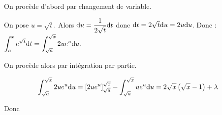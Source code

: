 \documentclass[a4paper,french,bookmarks]{article}
\begin{document}
\begin{enumerate}
{    On procède d'abord par changement de variable.
    
    On pose $u = \sqrt t$. Alors $\text du = \dfrac{1}{2\sqrt{t}}\text dt$ donc $\text dt = 2\sqrt{t}\text du = 2u\text du$. Donc :
    $\displaystyle \int_a^x e^{\sqrt t} \text dt = \int_{\sqrt a}^{\sqrt x} 2ue^u \text du$.
    
    On procède alors par intégration par partie.
    
    \[\int_{\sqrt a}^{\sqrt x} 2ue^u \text du = \left[2ue^u\right]_{\sqrt a}^{\sqrt x} - \int_{\sqrt a}^{\sqrt x} ue^u \text du = 2\sqrt{x}\left(\sqrt{x}-1\right) + \lambda\]
    
    Donc 
    }
\end{enumerate}
\end{document}
